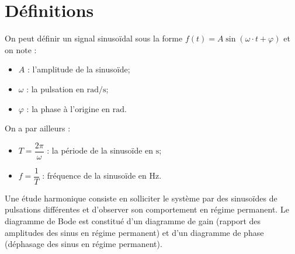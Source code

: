 \fichetrue
\proftrue
\tdfalse
\coursfalse

\def\xxnumchapitre{Chapitre 2 \vspace{.2cm}}
\def\xxchapitre{\hspace{.12cm} Réponse fréquentielle des SLCI}
\def\xxYCartouche{-2.25cm}
\def\xxposongletx{2}
\def\xxposonglettext{1.45}
\def\xxposonglety{19}%

\def\xxonglet{Cy 01 -- Ch 2}

\def\xxactivite{Fiche}


\def\xxpied{%
Cycle 01 -- Modéliser le comportement des systèmes multiphysiques\\
Ch 2 -- \xxactivite%
}

\setcounter{secnumdepth}{5}

\iflivret

\else

\fi
\vspace{.5cm}
\pagestyle{fancy}
\thispagestyle{plain}
\setcounter{section}{0}


\section{Définitions}


On peut définir un signal sinusoïdal sous la forme $
f(t)=A \sin(\omega \cdot t + \varphi)
$ et on note :


\begin{minipage}[c]{.45\linewidth}
\begin{itemize}
\item $A$ : l'amplitude de la sinusoïde;
\item $\omega$ : la pulsation en $\text{rad/s}$;
\item $\varphi$ : la phase à l'origine en $\text{rad}$.
\end{itemize}
\end{minipage}\hfill
\begin{minipage}[c]{.45\linewidth}
On a par ailleurs :
\begin{itemize}
\item $T=\dfrac{2\pi}{\omega}$ : la période de la sinusoïde en $\text{s}$;
\item $f=\dfrac{1}{T}$ : fréquence de la sinusoïde en $\text{Hz}$.
\end{itemize}
\end{minipage}

Une étude harmonique consiste en solliciter le système par des sinusoïdes de pulsations différentes et d'observer son comportement en régime permanent. Le diagramme de Bode est constitué d'un diagramme de gain (rapport des amplitudes des sinus en régime permanent) et d'un diagramme de phase (déphasage des sinus en régime permanent). 


